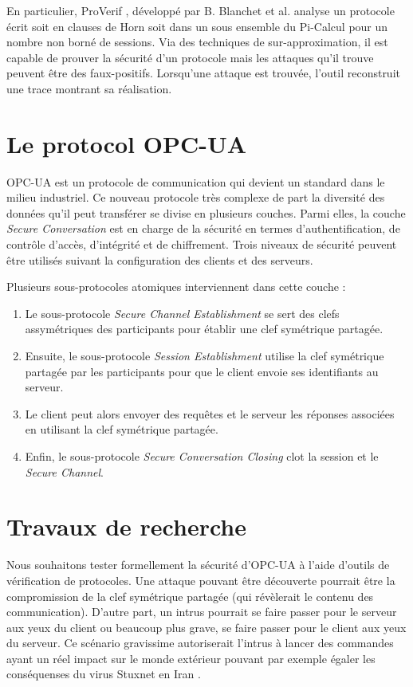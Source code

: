 \documentclass{article}
\newcommand{\proverif}{ProVerif}
\begin{document}
En particulier, \proverif{} \cite{Bla01,PROVERIF14_manual}, développé par B. Blanchet et al. analyse un protocole écrit
soit en clauses de Horn soit dans un sous ensemble du Pi-Calcul pour un nombre non borné
de sessions.
Via des techniques de sur-approximation, il est capable de prouver la sécurité d'un protocole
mais les attaques qu'il trouve peuvent être des faux-positifs.
Lorsqu'une attaque est trouvée, l'outil reconstruit une trace montrant sa réalisation.

\section{Le protocol OPC-UA}

OPC-UA \cite{MLD09} est un protocole de communication qui devient un standard dans le milieu industriel.
Ce nouveau protocole très complexe de part la diversité des données qu'il peut transférer
se divise en plusieurs couches. 
Parmi elles, la couche {\em Secure Conversation} est en charge de la sécurité en termes d'authentification,
de contrôle d'accès, d'intégrité et de chiffrement.
Trois niveaux de sécurité peuvent être utilisés suivant la configuration des clients et des serveurs.

Plusieurs sous-protocoles atomiques interviennent dans cette couche :
\begin{enumerate}
    \item Le sous-protocole {\em Secure Channel Establishment} se sert des
        clefs assymétriques des participants pour établir une clef symétrique partagée.
    \item Ensuite, le sous-protocole {\em Session Establishment} utilise la clef symétrique partagée
        par les participants pour que le client envoie ses identifiants au serveur.
    \item Le client peut alors envoyer des requêtes et le serveur les réponses associées
        en utilisant la clef symétrique partagée.
    \item Enfin, le sous-protocole {\em Secure Conversation Closing} clot la session et le {\em Secure Channel}.
\end{enumerate}

\section{Travaux de recherche}

Nous souhaitons tester formellement la sécurité d'OPC-UA à l'aide d'outils de vérification de protocoles.
Une attaque pouvant être découverte pourrait être la compromission de la clef symétrique partagée
(qui révèlerait le contenu des communication).
D'autre part, un intrus pourrait se faire passer pour le serveur aux yeux du client ou beaucoup plus grave, se faire passer
pour le client aux yeux du serveur.
Ce scénario gravissime autoriserait l'intrus à lancer des commandes ayant un réel impact sur le monde extérieur
pouvant par exemple égaler les conséquenses du virus Stuxnet en Iran \cite{Lan11}.
\end{document}
